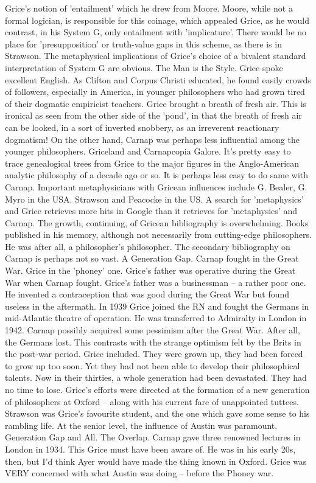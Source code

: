 \documentclass[10pt,titlepage]{book}
\begin{document}
Grice's notion  of 'entailment' which he drew from Moore. Moore, while not 
a formal logician, is  responsible for this coinage, which appealed Grice, 
as he would contrast, in his  System G, only entailment with 'implicature'. 
There would be no place for  'presupposition' or truth-value gaps in this 
scheme, as there is in Strawson.  The metaphysical implications of Grice's 
choice of a bivalent standard  interpretation of System G are obvious. 
The  Man is the Style. Grice spoke excellent English. As Clifton and Corpus 
Christi  educated, he found easily crowds of followers, especially in 
America, in younger  philosophers who had grown tired of their dogmatic 
empiricist teachers. Grice  brought a breath of fresh air. This is ironical as seen 
from the other side of  the 'pond', in that the breath of fresh air can be 
looked, in a sort of inverted  snobbery, as an irreverent reactionary 
dogmatism!  On the other hand,  Carnap was perhaps less influential among the 
younger philosophers.   
Griceland  and Carnapcopia Galore. It's pretty easy to trace genealogical 
trees from Grice  to the major figures in the Anglo-American analytic 
philosophy of a decade ago  or so. It is perhaps less easy to do same with Carnap. 
Important metaphysicians  with Gricean influences include G. Bealer, G. Myro 
in the USA. Strawson and  Peacocke in the US. A search for 'metaphysics' 
and Grice retrieves more hits in  Google than it retrieves for 'metaphysics' 
and Carnap. The growth, continuing,  of Gricean bibliography is overwhelming. 
Books published in his memory, although  not necessarily from cutting-edge 
philosophers. He was after all, a  philosopher's philosopher. The secondary 
bibliography on Carnap is perhaps not  so vast. 
A  Generation Gap. Carnap fought in the Great War. Grice in the 'phoney' 
one.  Grice's father was operative during the Great War when Carnap fought. 
Grice's  father was a businessman -- a rather poor one. He invented a 
contraception that  was good during the Great War but found useless in the 
aftermath. In 1939 Grice  joined the RN and fought the Germans in mid-Atlantic 
theatre of operation. He  was transferred to Admiralty in London in 1942. Carnap 
possibly acquired some  pessimism after the Great War. After all, the Germans 
lost. This contrasts  with the strange optimism felt by the Brits in the 
post-war period. Grice  included. They were grown up, they had been forced to 
grow up too soon. Yet they  had not been able to develop their philosophical 
talents. Now in their thirties,  a whole generation had been devastated. 
They had no time to lose. Grice's  efforts were directed at the formation of a 
new generation of philosophers at  Oxford -- along with his current fare of 
unappointed tuttees. Strawson was  Grice's favourite student, and the one 
which gave some sense to his rambling  life. At the senior level, the 
influence of Austin was  paramount. 
Generation  Gap and All. The Overlap. Carnap gave three renowned lectures 
in London in 1934. This  Grice must have been aware of. He was in his early 
20s, then, but I’d think Ayer  would have made the thing known in Oxford. 
Grice was VERY  concerned with  what Austin was doing -- before the Phoney war.
\end{document}
